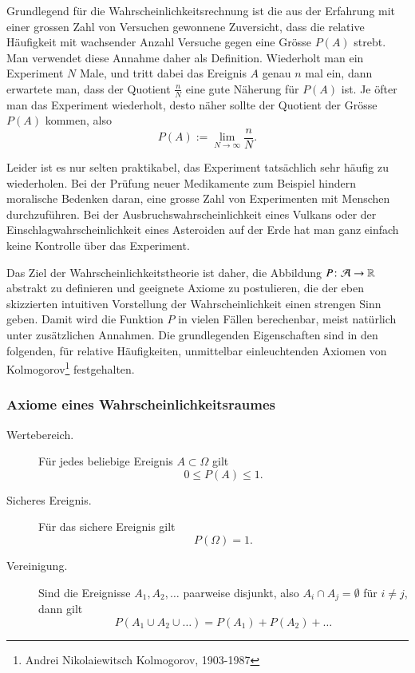 Grundlegend für die Wahrscheinlichkeitsrechnung ist die aus der
Erfahrung mit einer grossen Zahl von Versuchen gewonnene Zuversicht,
dass die relative Häufigkeit mit wachsender Anzahl Versuche gegen
eine Grösse $P(A)$ strebt.
Man verwendet diese Annahme daher als Definition.
Wiederholt man ein Experiment $N$ Male, und tritt dabei das Ereignis $A$
genau $n$ mal ein, dann erwartete man, dass der Quotient $\frac{n}{N}$
eine gute Näherung für $P(A)$ ist.
Je öfter man das Experiment
wiederholt, desto näher sollte der Quotient der Grösse $P(A)$
kommen, also
\[
P(A) := \lim_{N\to\infty}\frac{n}{N}.
\]

Leider ist es nur selten praktikabel, das Experiment tatsächlich
sehr häufig zu wiederholen.
Bei der Prüfung neuer Medikamente
zum Beispiel hindern moralische Bedenken daran, eine grosse
Zahl von Experimenten mit Menschen durchzuführen.
Bei der
Ausbruchswahrscheinlichkeit eines Vulkans oder der
Einschlagwahrscheinlichkeit eines Asteroiden auf der Erde hat man
ganz einfach keine Kontrolle über das Experiment.

Das Ziel der Wahrscheinlichkeitstheorie ist daher, 
die Abbildung $P\colon {\cal A}\to\mathbb{R}$
abstrakt zu definieren und geeignete Axiome zu postulieren, die
der eben skizzierten intuitiven Vorstellung der Wahrscheinlichkeit
einen strengen Sinn geben.
Damit wird die Funktion $P$ in vielen
Fällen berechenbar, meist natürlich unter zusätzlichen Annahmen.
Die grundlegenden Eigenschaften sind in den folgenden, für
relative Häufigkeiten, unmittelbar einleuchtenden Axiomen
von Kolmogorov\footnote{Andrei Nikolaiewitsch Kolmogorov, 1903-1987}
festgehalten.

\subsubsection{Axiome  eines Wahrscheinlichkeitsraumes}

\begin{description}
\item[Wertebereich.]Für jedes beliebige Ereignis $A\subset \Omega$
gilt
\begin{equation}
0\le P(A)\le 1.
\label{p-wertebereich}
\end{equation}
\item[Sicheres Ereignis.] Für das sichere Ereignis gilt
\begin{equation}
P(\Omega) = 1.
\label{p-sicheresereignis}
\end{equation}
\item[Vereinigung.] Sind die Ereignisse $A_1,A_2,\dots$ paarweise
disjunkt, also $A_i\cap A_j=\emptyset$ für $i\ne j$, dann gilt
\begin{equation}
P(A_1\cup A_2\cup \dots) = P(A_1) + P(A_2) + \dots
\label{p-summenformel}
\end{equation}
\end{description}

